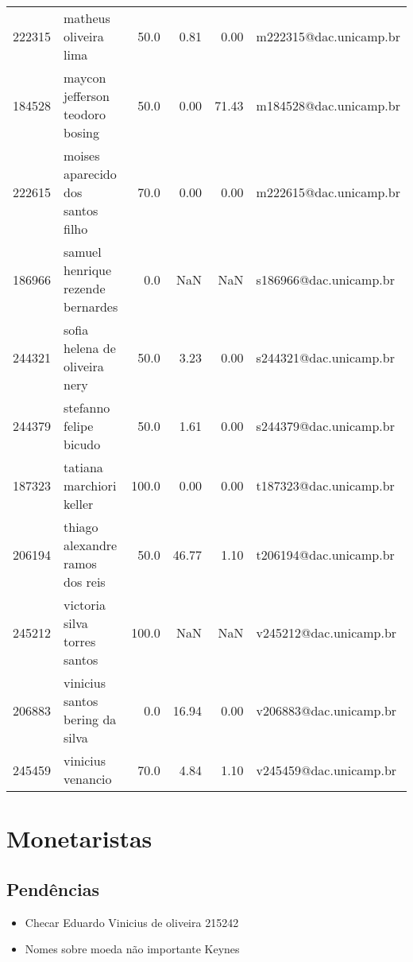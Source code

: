 \documentclass[11pt]{article}
\begin{document}
{\begin{landscape}
\begin{longtable}{llrrrl}
222315 &                 matheus oliveira lima &                  50.0 &        0.81 &        0.00 &  m222315@dac.unicamp.br \\
184528 &       maycon jefferson teodoro bosing &                  50.0 &        0.00 &       71.43 &  m184528@dac.unicamp.br \\
222615 &     moises aparecido dos santos filho &                  70.0 &        0.00 &        0.00 &  m222615@dac.unicamp.br \\
186966 &     samuel henrique rezende bernardes &                   0.0 &         NaN &         NaN &  s186966@dac.unicamp.br \\
244321 &         sofia helena de oliveira nery &                  50.0 &        3.23 &        0.00 &  s244321@dac.unicamp.br \\
244379 &                stefanno felipe bicudo &                  50.0 &        1.61 &        0.00 &  s244379@dac.unicamp.br \\
187323 &              tatiana marchiori keller &                 100.0 &        0.00 &        0.00 &  t187323@dac.unicamp.br \\
206194 &       thiago alexandre ramos dos reis &                  50.0 &       46.77 &        1.10 &  t206194@dac.unicamp.br \\
245212 &          victoria silva torres santos &                 100.0 &         NaN &         NaN &  v245212@dac.unicamp.br \\
206883 &       vinicius santos bering da silva &                   0.0 &       16.94 &        0.00 &  v206883@dac.unicamp.br \\
245459 &                     vinicius venancio &                  70.0 &        4.84 &        1.10 &  v245459@dac.unicamp.br \\
\end{longtable}
\end{landscape}}



\section{Monetaristas}
\label{sec:orgc3b65e0}

\subsection{Pendências}
\label{sec:org9627716}

\begin{itemize}
\item Checar Eduardo Vinicius de oliveira 215242
\item Nomes sobre moeda não importante Keynes
\end{itemize}
\end{document}
